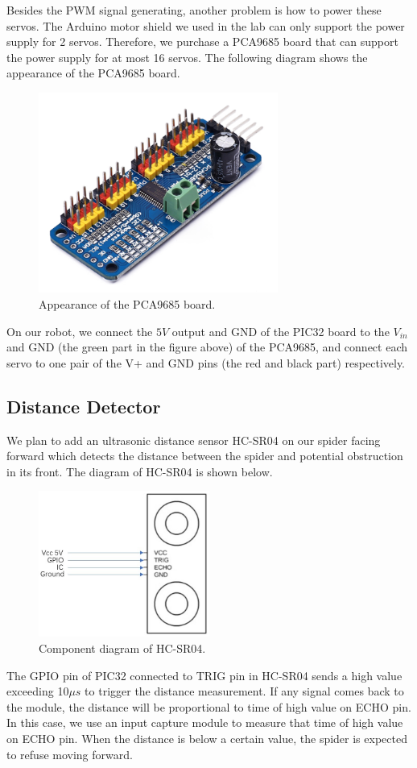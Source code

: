 \documentclass[a4paper]{article}
\begin{document}
Besides the PWM signal generating, another problem is how to power these servos. The Arduino motor shield we used in the lab can only support the power supply for 2 servos. Therefore, we purchase a PCA9685 board that can support the power supply for at most 16 servos. The following diagram shows the appearance of the PCA9685 board.

\begin{figure}[H]
    \centering
    \includegraphics[width=0.7\textwidth]{PCA.png}
    \caption{Appearance of the PCA9685 board.}
\end{figure}

On our robot, we connect the $5V$ output and GND of the PIC32 board to the $V_{in}$ and GND (the green part in the figure above) of the PCA9685, and connect each servo to one pair of the V+ and GND pins (the red and black part) respectively.

\subsection{Distance Detector}
We plan to add an ultrasonic distance sensor HC-SR04 on our spider facing forward which detects the distance between the spider and potential obstruction in its front. The diagram of HC-SR04 is shown below.
\begin{figure}[H]
    \centering
    \includegraphics[width=0.5\textwidth]{SR.jpg}
    \caption{Component diagram of HC-SR04.}
\end{figure}
The GPIO pin of PIC32 connected to TRIG pin in HC-SR04 sends a high value exceeding 10$\mu s$ to trigger the distance measurement. If any signal comes back to the module, the distance will be proportional to time of high value on ECHO pin. In this case, we use an input capture module to measure that time of high value on ECHO pin. When the distance is below a certain value, the spider is expected to refuse moving forward.
\end{document}
